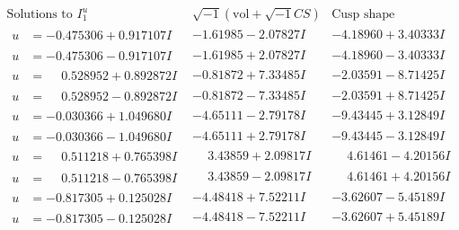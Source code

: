 \documentclass[1p]{elsarticle_modified}
\theoremstyle{definition}
\newcommand{\I}{\sqrt{-1}}
\begin{document}
$$\begin{array}{c|c|c}  
\text{Solutions to }I^u_{1}& \I (\text{vol} + \sqrt{-1}CS) & \text{Cusp shape}\\
 \hline 
\begin{aligned}
u &= -0.475306 + 0.917107 I\end{aligned}
 & -1.61985 - 2.07827 I & -4.18960 + 3.40333 I \\ \hline\begin{aligned}
u &= -0.475306 - 0.917107 I\end{aligned}
 & -1.61985 + 2.07827 I & -4.18960 - 3.40333 I \\ \hline\begin{aligned}
u &= \phantom{-}0.528952 + 0.892872 I\end{aligned}
 & -0.81872 + 7.33485 I & -2.03591 - 8.71425 I \\ \hline\begin{aligned}
u &= \phantom{-}0.528952 - 0.892872 I\end{aligned}
 & -0.81872 - 7.33485 I & -2.03591 + 8.71425 I \\ \hline\begin{aligned}
u &= -0.030366 + 1.049680 I\end{aligned}
 & -4.65111 - 2.79178 I & -9.43445 + 3.12849 I \\ \hline\begin{aligned}
u &= -0.030366 - 1.049680 I\end{aligned}
 & -4.65111 + 2.79178 I & -9.43445 - 3.12849 I \\ \hline\begin{aligned}
u &= \phantom{-}0.511218 + 0.765398 I\end{aligned}
 & \phantom{-}3.43859 + 2.09817 I & \phantom{-}4.61461 - 4.20156 I \\ \hline\begin{aligned}
u &= \phantom{-}0.511218 - 0.765398 I\end{aligned}
 & \phantom{-}3.43859 - 2.09817 I & \phantom{-}4.61461 + 4.20156 I \\ \hline\begin{aligned}
u &= -0.817305 + 0.125028 I\end{aligned}
 & -4.48418 + 7.52211 I & -3.62607 - 5.45189 I \\ \hline\begin{aligned}
u &= -0.817305 - 0.125028 I\end{aligned}
 & -4.48418 - 7.52211 I & -3.62607 + 5.45189 I \\ \hline\begin{aligned}

\end{aligned}
\end{array}$$
\end{document}
